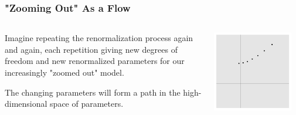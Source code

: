 \documentclass[aspectratio=169, 12pt]{beamer}
\begin{document}
\begin{frame}

    \frametitle{"Zooming Out" As a Flow}

    \begin{columns}
    \begin{column}{.6\textwidth}
        Imagine repeating the renormalization process again and again, each repetition giving new degrees of freedom and new renormalized parameters for our increasingly "zoomed out" model. 

        \vspace{1em}
        
        The changing parameters will form a path in the high-dimensional space of parameters. 
        
    \end{column}
    \begin{column}{.4\textwidth}
        \includegraphics[width=0.9\textwidth]{images/discrete-steps.png}
    \end{column}
    \end{columns}

\end{frame}
\end{document}
